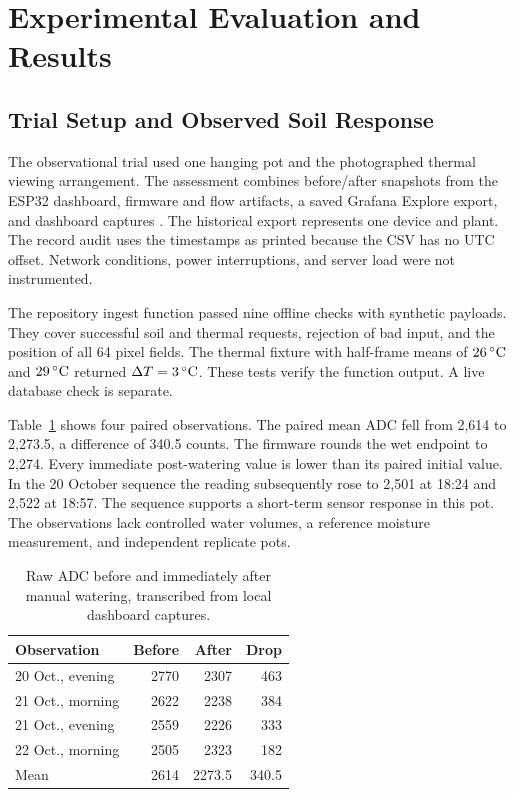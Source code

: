 \section{Experimental Evaluation and Results}
\subsection{Trial Setup and Observed Soil Response}
The observational trial used one hanging pot and the photographed thermal viewing arrangement. The assessment combines before/after snapshots from the ESP32 dashboard, firmware and flow artifacts, a saved Grafana Explore export, and dashboard captures \cite{projectevidence}. The historical export represents one device and plant. The record audit uses the timestamps as printed because the CSV has no UTC offset. Network conditions, power interruptions, and server load were not instrumented.

The repository ingest function passed nine offline checks with synthetic payloads. They cover successful soil and thermal requests, rejection of bad input, and the position of all 64 pixel fields. The thermal fixture with half-frame means of $26\,^{\circ}\mathrm{C}$ and $29\,^{\circ}\mathrm{C}$ returned $\Delta T=3\,^{\circ}\mathrm{C}$. These tests verify the function output. A live database check is separate.

Table~\ref{tab:watering} shows four paired observations. The paired mean ADC fell from 2,614 to 2,273.5, a difference of 340.5 counts. The firmware rounds the wet endpoint to 2,274. Every immediate post-watering value is lower than its paired initial value. In the 20 October sequence the reading subsequently rose to 2,501 at 18:24 and 2,522 at 18:57. The sequence supports a short-term sensor response in this pot. The observations lack controlled water volumes, a reference moisture measurement, and independent replicate pots.

\begin{table}[!t]
\caption{Raw ADC before and immediately after manual watering, transcribed from local dashboard captures.}
\label{tab:watering}
\centering\footnotesize
\begin{tabular}{@{}lrrr@{}}
\hline
Observation & Before & After & Drop\\ \hline
20 Oct., evening & 2770 & 2307 & 463\\
21 Oct., morning & 2622 & 2238 & 384\\
21 Oct., evening & 2559 & 2226 & 333\\
22 Oct., morning & 2505 & 2323 & 182\\ \hline
Mean & 2614 & 2273.5 & 340.5\\ \hline
\end{tabular}
\end{table}

